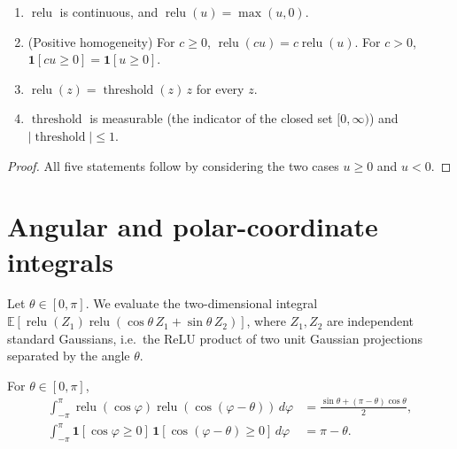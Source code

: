 \begin{lemma}\label{lem:ntkr:reluProps}
  \leanok
\begin{enumerate}
  \item $\operatorname{relu}$ is continuous, and $\operatorname{relu}(u)=\max(u,0)$.
  \item (Positive homogeneity) For $c\ge0$, $\operatorname{relu}(cu)=c\operatorname{relu}(u)$. For $c>0$,
        $\mathbf 1[cu\ge0]=\mathbf 1[u\ge0]$.
  \item $\operatorname{relu}(z)=\operatorname{threshold}(z)\,z$ for every $z$.
  \item $\operatorname{threshold}$ is measurable (the indicator of the closed set $[0,\infty)$) and
        $|\operatorname{threshold}|\le1$.
\end{enumerate}
\end{lemma}

\begin{proof}
  \leanok
All five statements follow by considering the two cases $u\ge0$ and $u<0$.
\end{proof}


\section{Angular and polar-coordinate integrals}\label{sec:ntkr:polar}

Let $\theta\in[0,\pi]$. We evaluate the two-dimensional integral
$\mathbb E[\operatorname{relu}(Z_1)\operatorname{relu}(\cos\theta\,Z_1+\sin\theta\,Z_2)]$, where $Z_1,Z_2$ are independent
standard Gaussians, i.e.\ the ReLU product of two unit Gaussian projections separated by the angle $\theta$.

\begin{lemma}\label{lem:ntkr:angular}
  \leanok
For $\theta\in[0,\pi]$,
\begin{align*}
  \int_{-\pi}^{\pi}\operatorname{relu}(\cos\varphi)\operatorname{relu}(\cos(\varphi-\theta))\,d\varphi
  &=\frac{\sin\theta+(\pi-\theta)\cos\theta}{2},\\
  \int_{-\pi}^{\pi}\mathbf 1[\cos\varphi\ge0]\,\mathbf 1[\cos(\varphi-\theta)\ge0]\,d\varphi&=\pi-\theta .
\end{align*}
\end{lemma}

